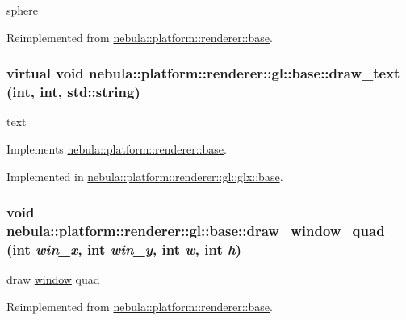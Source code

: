 sphere 

Reimplemented from \hyperlink{classnebula_1_1platform_1_1renderer_1_1base_ab11ea0309016e4687bbf26808245c3dd}{nebula::platform::renderer::base}.\hypertarget{classnebula_1_1platform_1_1renderer_1_1gl_1_1base_af810a42a4c3731488253ee268352f456}{
\subsubsection[{draw\_\-text}]{\setlength{\rightskip}{0pt plus 5cm}virtual void nebula::platform::renderer::gl::base::draw\_\-text (int, \/  int, \/  std::string)}}
\label{classnebula_1_1platform_1_1renderer_1_1gl_1_1base_af810a42a4c3731488253ee268352f456}


text 

Implements \hyperlink{classnebula_1_1platform_1_1renderer_1_1base_afee2147d5f479f6c859c600fc224012c}{nebula::platform::renderer::base}.

Implemented in \hyperlink{classnebula_1_1platform_1_1renderer_1_1gl_1_1glx_1_1base_a3bed53ee587076a42419e5323ffd4b13}{nebula::platform::renderer::gl::glx::base}.\hypertarget{classnebula_1_1platform_1_1renderer_1_1gl_1_1base_abd5831cdc84edc5bece8a23296acba2b}{
\subsubsection[{draw\_\-window\_\-quad}]{\setlength{\rightskip}{0pt plus 5cm}void nebula::platform::renderer::gl::base::draw\_\-window\_\-quad (int {\em win\_\-x}, \/  int {\em win\_\-y}, \/  int {\em w}, \/  int {\em h})}}
\label{classnebula_1_1platform_1_1renderer_1_1gl_1_1base_abd5831cdc84edc5bece8a23296acba2b}


draw \hyperlink{namespacenebula_1_1platform_1_1window}{window} quad 

Reimplemented from \hyperlink{classnebula_1_1platform_1_1renderer_1_1base_a53de4e109fe24d7254aa1b5864cbe283}{nebula::platform::renderer::base}.

